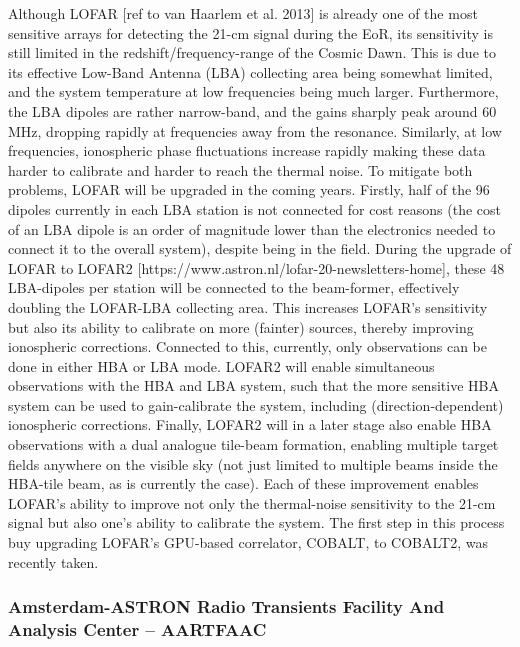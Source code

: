 Although LOFAR [ref to van Haarlem et al. 2013] is already one of the most sensitive arrays for detecting the 21-cm signal during the EoR, its sensitivity is still limited in the redshift/frequency-range of the Cosmic Dawn. This is due to its effective Low-Band Antenna (LBA) collecting area being somewhat limited, and the system temperature at low frequencies being much larger. Furthermore, the LBA dipoles are rather narrow-band, and the gains sharply peak around 60\,MHz, dropping rapidly at frequencies away from the resonance. Similarly, at low frequencies,  ionospheric phase fluctuations increase rapidly making these data harder to calibrate and harder to reach the thermal noise. To mitigate both problems, LOFAR will be upgraded in the coming years. Firstly, half of the 96 dipoles currently in each LBA station is not connected for cost reasons (the cost of an LBA dipole is an order of magnitude lower than the electronics needed to connect it to the overall system), despite being in the field. During the upgrade of LOFAR to LOFAR2 [https://www.astron.nl/lofar-20-newsletters-home], these 48 LBA-dipoles per station will be connected to the beam-former, effectively doubling the LOFAR-LBA collecting area. This increases LOFAR's sensitivity but also its ability to calibrate on more (fainter) sources, thereby improving ionospheric corrections. Connected to this, currently, only observations can be done in either HBA or LBA mode. LOFAR2 will enable simultaneous observations with the HBA and LBA system, such that the more sensitive HBA system can be used to gain-calibrate the system, including (direction-dependent) ionospheric corrections. Finally, LOFAR2 will in a later stage also enable HBA observations with a dual analogue tile-beam formation, enabling multiple target fields anywhere on the visible sky (not just limited to multiple beams inside the HBA-tile beam, as is currently the case). Each of these improvement enables LOFAR's ability to improve not only the thermal-noise sensitivity to the 21-cm signal but also one's ability to calibrate the system. The first step in this process buy upgrading LOFAR's GPU-based correlator, COBALT, to COBALT2, was recently taken.  

\subsubsection{Amsterdam-ASTRON Radio Transients Facility And Analysis Center -- AARTFAAC}

